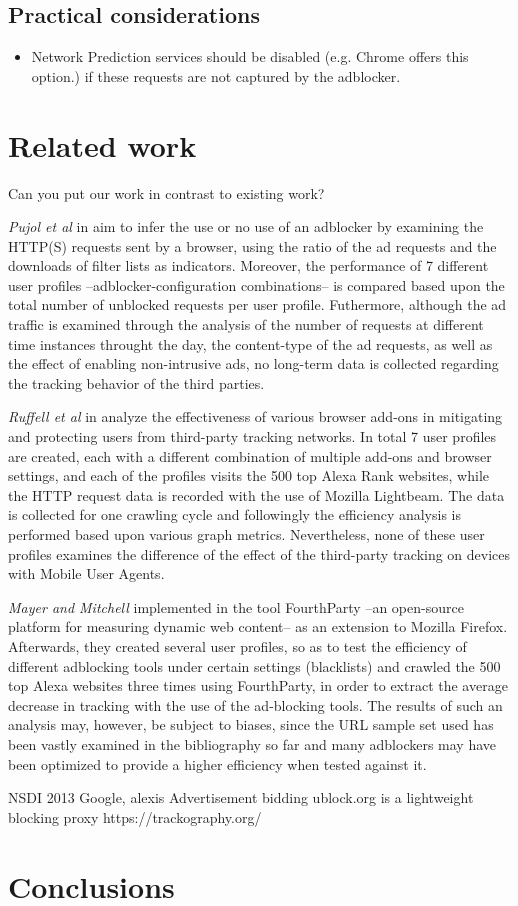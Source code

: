 \documentclass{sig-alternate}
\begin{document}
\subsection{Practical considerations}
\begin{itemize}
\item Network Prediction services should be disabled (e.g. Chrome offers this option.) if these requests are not captured by the adblocker.
\end{itemize}

\section{Related work}
{\color{red}Can you put our work in contrast to existing work?}
{\color{blue}
\textit{Pujol et al} in \cite{pujol} aim to infer the use or no use of an adblocker by examining the HTTP(S) requests sent by a browser, using the ratio of the ad requests and the downloads of filter lists as indicators. Moreover, the performance of 7 different user profiles --adblocker-configuration combinations-- is compared based upon the total number of unblocked requests per user profile. Futhermore, although the ad traffic is examined through the analysis of the number of requests at different time instances throught the day, the content-type of the ad requests, as well as the effect of enabling non-intrusive ads, no long-term data is collected regarding the tracking behavior of the third parties.

\textit{Ruffell et al} in \cite{ruffel2015} analyze the effectiveness of various browser add-ons in mitigating and protecting users from third-party tracking networks. In total 7 user profiles are created, each with a different combination of multiple add-ons and browser settings, and each of the profiles visits the 500 top Alexa Rank websites, while the HTTP request data is recorded with the use of Mozilla Lightbeam. The data is collected for one crawling cycle and followingly the efficiency analysis is performed based upon various graph metrics. Nevertheless, none of these user profiles examines the difference of the effect of the third-party tracking on devices with Mobile User Agents.

\textit{Mayer and Mitchell} implemented in \cite{mayer} the tool FourthParty --an open-source platform for measuring dynamic web content-- as an extension to Mozilla Firefox. Afterwards, they created several user profiles, so as to test the efficiency of different adblocking tools under certain settings (blacklists) and crawled the 500 top Alexa websites three times using FourthParty, in order to extract the average decrease in tracking with the use of the ad-blocking tools. The results of such an analysis may, however, be subject to biases, since the URL sample set used has been vastly examined in the bibliography so far and many adblockers may have been optimized to provide a higher efficiency when tested against it.
}

NSDI 2013 Google, alexis
Advertisement bidding
ublock.org is a lightweight blocking proxy
https://trackography.org/

\section{Conclusions} \label{sec:conclusions}



\end{document}
